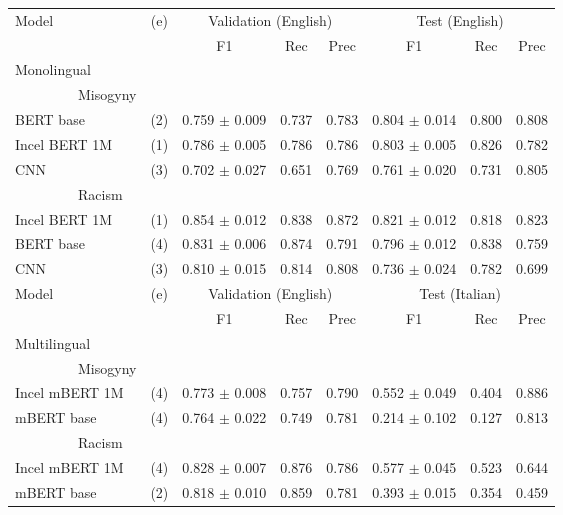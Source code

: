 \begin{tabular}{lc|ccc|ccc}
\hline
\multirow{2}{*}[0pt]{Model}   &     \multirow{2}{*}[0pt]{(e)} &  \multicolumn{3}{c|}{Validation (English)}              & \multicolumn{3}{c}{Test (English)} \\
\cline{3-8}
&     &       F1  &    Rec &   Prec &        F1  &   Rec   &   Prec \\
\hline
Monolingual\\
~~~~~~~~~Misogyny\\
\hline
BERT base      & (2) &  0.759 $\pm$          0.009 &    0.737 &     0.783 &    0.804 $\pm$           0.014 &     0.800 &      0.808 \\
Incel BERT 1M  & (1) &  0.786 $\pm$          0.005 &    0.786 &     0.786 &    0.803 $\pm$           0.005 &     0.826 &      0.782 \\
CNN            & (3) &  0.702 $\pm$          0.027 &    0.651 &     0.769 &    0.761 $\pm$           0.020 &     0.731 &      0.805 \\
\hline
~~~~~~~~~Racism\\
\hline
Incel BERT 1M  & (1) &  0.854 $\pm$          0.012 &    0.838 &     0.872 &    0.821 $\pm$           0.012 &     0.818 &      0.823 \\
BERT base      & (4) &  0.831 $\pm$          0.006 &    0.874 &     0.791 &    0.796 $\pm$           0.012 &     0.838 &      0.759 \\
CNN            & (3) &  0.810 $\pm$          0.015 &    0.814 &     0.808 &    0.736 $\pm$           0.024 &     0.782 &      0.699 \\
\hline
\multirow{2}{*}[0pt]{Model}   &     \multirow{2}{*}[0pt]{(e)} &  \multicolumn{3}{c|}{Validation (English)}              & \multicolumn{3}{c}{Test (Italian)} \\
\cline{3-8}
&     &       F1  &    Rec &   Prec &        F1  &   Rec   &   Prec \\
\hline
Multilingual\\
~~~~~~~~~Misogyny\\
\hline
Incel mBERT 1M & (4) &  0.773 $\pm$          0.008 &    0.757 &     0.790 &    0.552 $\pm$           0.049 &     0.404 &      0.886 \\
mBERT base     & (4) &  0.764 $\pm$          0.022 &    0.749 &     0.781 &    0.214 $\pm$           0.102 &     0.127 &      0.813 \\
\hline
~~~~~~~~~Racism\\
\hline
Incel mBERT 1M & (4) &  0.828 $\pm$          0.007 &    0.876 &     0.786 &    0.577 $\pm$           0.045 &     0.523 &      0.644 \\
mBERT base     & (2) &  0.818 $\pm$          0.010 &    0.859 &     0.781 &    0.393 $\pm$           0.015 &     0.354 &      0.459 \\
\hline
\end{tabular}


